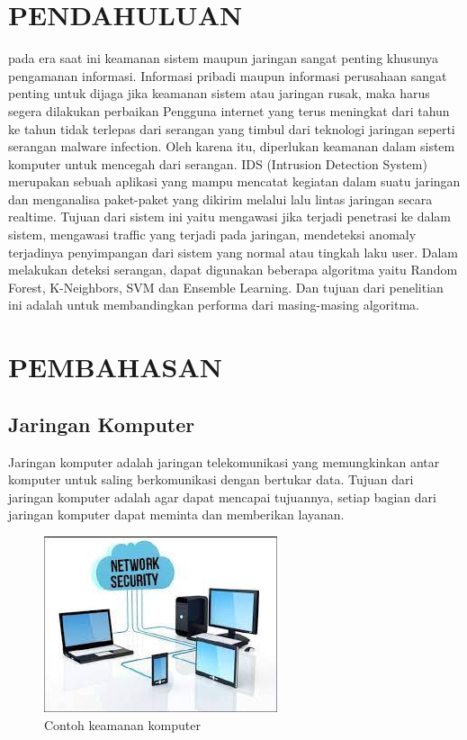 \documentclass[conference]{IEEEtran}
\begin{document}
\section{PENDAHULUAN}
pada era saat ini keamanan sistem maupun jaringan sangat
penting khusunya pengamanan informasi. Informasi pribadi
maupun informasi perusahaan sangat penting untuk dijaga
jika keamanan sistem atau jaringan rusak, maka harus segera
dilakukan perbaikan
Pengguna internet yang terus meningkat dari tahun ke
tahun tidak terlepas dari serangan yang timbul dari teknologi
jaringan seperti serangan malware infection. Oleh karena itu,
diperlukan keamanan dalam sistem komputer untuk mencegah
dari serangan.
IDS (Intrusion Detection System) merupakan sebuah aplikasi yang mampu mencatat kegiatan dalam suatu jaringan
dan menganalisa paket-paket yang dikirim melalui lalu lintas
jaringan secara realtime. Tujuan dari sistem ini yaitu mengawasi jika terjadi penetrasi ke dalam sistem, mengawasi traffic yang terjadi pada jaringan, mendeteksi anomaly terjadinya
penyimpangan dari sistem yang normal atau tingkah laku user.
Dalam melakukan deteksi serangan, dapat digunakan beberapa algoritma yaitu Random Forest, K-Neighbors, SVM dan
Ensemble Learning. Dan tujuan dari penelitian ini adalah untuk membandingkan performa dari masing-masing algoritma.

\section{PEMBAHASAN}

\subsection{Jaringan Komputer}

Jaringan komputer adalah jaringan telekomunikasi yang memungkinkan antar komputer untuk saling berkomunikasi dengan bertukar data. Tujuan dari jaringan komputer adalah agar dapat mencapai tujuannya, setiap bagian dari jaringan komputer dapat meminta dan memberikan layanan.

\begin{figure}
\centering
\includegraphics[width=.4\textwidth]{Gambar/gambar7.jpg}
\caption{Contoh keamanan komputer}
\end{figure}
\end{document}
